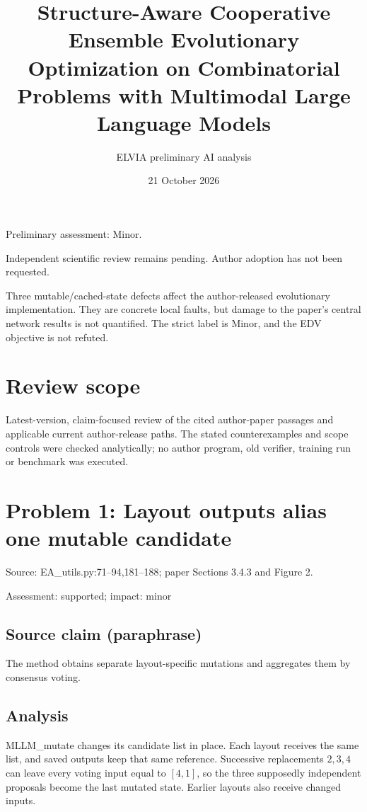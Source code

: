 \documentclass[11pt]{article}
\begin{document}
\title{Structure-Aware Cooperative Ensemble Evolutionary Optimization on Combinatorial Problems with Multimodal Large Language Models}

\author{ELVIA preliminary AI analysis}\date{21 October 2026}\maketitle

Preliminary assessment: Minor.\par

Independent scientific review remains pending. Author adoption has not been requested.

Three mutable/cached-state defects affect the author-released evolutionary implementation. They are concrete local faults, but damage to the paper's central network results is not quantified. The strict label is Minor, and the EDV objective is not refuted.

\section*{Review scope}

Latest-version, claim-focused review of the cited author-paper passages and applicable current author-release paths. The stated counterexamples and scope controls were checked analytically; no author program, old verifier, training run or benchmark was executed.

\section*{Problem 1: Layout outputs alias one mutable candidate}

Source: EA\_utils.py:71–94,181–188; paper Sections 3.4.3 and Figure 2.

Assessment: supported; impact: minor

\subsection*{Source claim (paraphrase)}

The method obtains separate layout-specific mutations and aggregates them by consensus voting.

\subsection*{Analysis}

MLLM\_mutate changes its candidate list in place. Each layout receives the same list, and saved outputs keep that same reference. Successive replacements \(2,3,4\) can leave every voting input equal to \([4,1]\), so the three supposedly independent proposals become the last mutated state. Earlier layouts also receive changed inputs.
\end{document}
